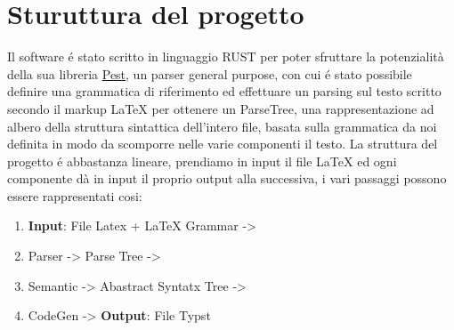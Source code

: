 ﻿\documentclass{article}
\begin{document}
    \section{Sturuttura del progetto}
    Il software é stato scritto in linguaggio RUST per poter sfruttare la potenzialità della sua libreria \href{https://docs.rs/pest/2.8.6/pest/}{Pest}, un parser general purpose, con cui é stato possibile definire una grammatica di riferimento ed effettuare un parsing sul testo scritto secondo il markup LaTeX per ottenere un ParseTree, una rappresentazione ad albero della struttura sintattica dell'intero file, basata sulla grammatica da noi definita in modo da scomporre nelle varie componenti il testo.
    La struttura del progetto é abbastanza lineare, prendiamo in input il file LaTeX ed ogni componente dà in input il proprio output alla successiva, i vari passaggi possono essere rappresentati cosi:
    \begin{enumerate}
        \item \textbf{Input}: File Latex + LaTeX Grammar ->
        \item Parser -> Parse Tree ->
        \item Semantic -> Abastract Syntatx Tree ->
        \item CodeGen -> \textbf{Output}: File Typst
    \end{enumerate}
\end{document}
